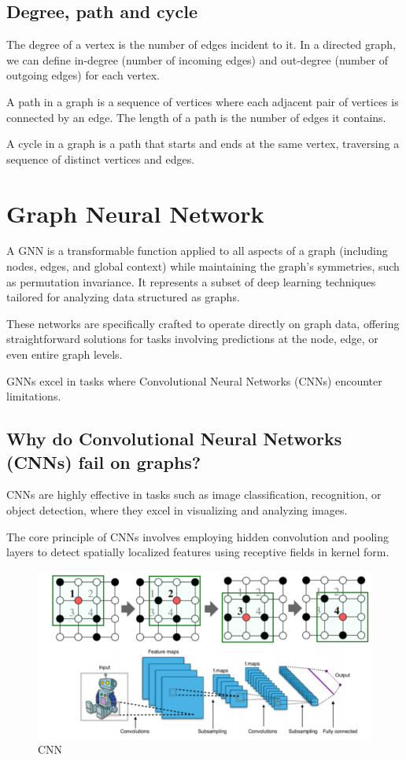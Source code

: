\subsection{Degree, path and cycle}
\hspace{\parindent}
The degree of a vertex is the number of edges incident to it. In a directed graph, we can define in-degree (number of incoming edges) and out-degree (number of outgoing edges) for each vertex.

A path in a graph is a sequence of vertices where each adjacent pair of vertices is connected by an edge. The length of a path is the number of edges it contains.

A cycle in a graph is a path that starts and ends at the same vertex, traversing a sequence of distinct vertices and edges.

\section{Graph Neural Network}
\hspace{\parindent}
A GNN is a transformable function applied to all aspects of a graph (including nodes, edges, and global context) while maintaining the graph's symmetries, such as permutation invariance. It represents a subset of deep learning techniques tailored for analyzing data structured as graphs.

These networks are specifically crafted to operate directly on graph data, offering straightforward solutions for tasks involving predictions at the node, edge, or even entire graph levels.

GNNs excel in tasks where Convolutional Neural Networks (CNNs) encounter limitations.

\subsection{Why do Convolutional Neural Networks (CNNs) fail on graphs?}
\hspace{\parindent}

CNNs are highly effective in tasks such as image classification, recognition, or object detection, where they excel in visualizing and analyzing images.

The core principle of CNNs involves employing hidden convolution and pooling layers to detect spatially localized features using receptive fields in kernel form.

\begin{figure}[H]
  \centering
  \includegraphics[width=0.7\linewidth]{cnn_on_img.png}
  \caption{CNN}
  \label{fig:usecase}
\end{figure}


